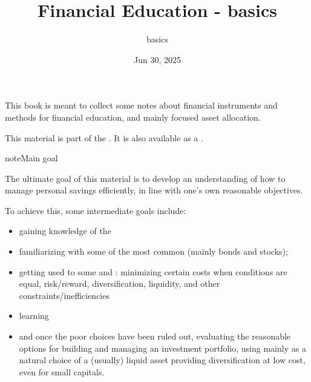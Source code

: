 \documentclass[letterpaper,10pt,english]{jupyterBook}
\title{Financial Education - basics}
\date{Jun 30, 2025}
\author{basics}
\begin{document}
\pagestyle{empty}
\sphinxmaketitle
\pagestyle{plain}
\sphinxtableofcontents
\pagestyle{normal}
\label{\detokenize{intro::doc}}


\sphinxAtStartPar
This book is meant to collect some notes about financial instruments and methods for financial education, and mainly focused asset allocation.

\sphinxAtStartPar
This material is part of the . It is also available as a .

\begin{sphinxadmonition}{note}{Main goal}

\sphinxAtStartPar
The ultimate goal of this material is to develop an understanding of how to manage personal savings efficiently, in line with one’s own reasonable objectives.

\sphinxAtStartPar
To achieve this, some intermediate goals include:
\begin{itemize}
\item {} 
\sphinxAtStartPar
gaining knowledge of the 

\item {} 
\sphinxAtStartPar
familiarizing with some of the most common  (mainly bonds and stocks);

\item {} 
\sphinxAtStartPar
getting used to some  and : minimizing certain costs when conditions are equal, risk/reward, diversification, liquidity, and other constraints/inefficiencies

\item {} 
\sphinxAtStartPar
learning 

\item {} 
\sphinxAtStartPar
and once the poor choices have been ruled out, evaluating the reasonable options for building and managing an investment portfolio, using mainly {\hyperref[\detokenize{ch/assets/etfs:fin-edu-assets-etfs}]{}} as a natural choice of a (usually) liquid asset providing diversification at low cost, even for small capitals.

\end{itemize}
\end{sphinxadmonition}
\end{document}
